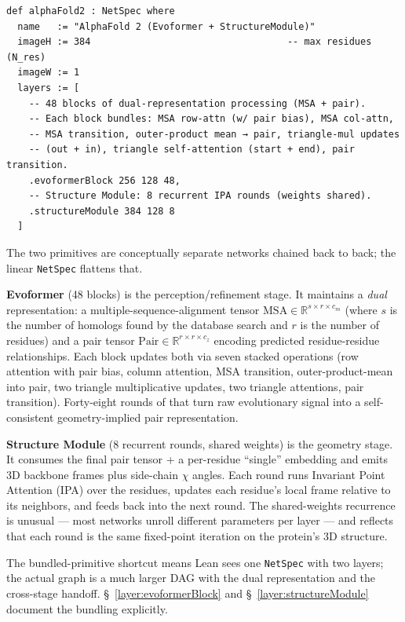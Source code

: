 \appendix

\begin{verbatim}
def alphaFold2 : NetSpec where
  name   := "AlphaFold 2 (Evoformer + StructureModule)"
  imageH := 384                                   -- max residues (N_res)
  imageW := 1
  layers := [
    -- 48 blocks of dual-representation processing (MSA + pair).
    -- Each block bundles: MSA row-attn (w/ pair bias), MSA col-attn,
    -- MSA transition, outer-product mean → pair, triangle-mul updates
    -- (out + in), triangle self-attention (start + end), pair transition.
    .evoformerBlock 256 128 48,
    -- Structure Module: 8 recurrent IPA rounds (weights shared).
    .structureModule 384 128 8
  ]
\end{verbatim}

The two primitives are conceptually separate networks chained back to
back; the linear \texttt{NetSpec} flattens that.

\textbf{Evoformer} (48 blocks) is the perception/refinement stage. It
maintains a \emph{dual} representation: a multiple-sequence-alignment
tensor $\mathrm{MSA}\!\in\!\mathbb{R}^{s \times r \times c_m}$ (where
$s$ is the number of homologs found by the database search and $r$ is
the number of residues) and a pair tensor
$\mathrm{Pair}\!\in\!\mathbb{R}^{r \times r \times c_z}$ encoding
predicted residue-residue relationships. Each block updates both via
seven stacked operations (row attention with pair bias, column
attention, MSA transition, outer-product-mean into pair, two triangle
multiplicative updates, two triangle attentions, pair transition).
Forty-eight rounds of that turn raw evolutionary signal into a
self-consistent geometry-implied pair representation.

\textbf{Structure Module} (8 recurrent rounds, shared weights) is the
geometry stage. It consumes the final pair tensor + a per-residue
``single'' embedding and emits 3D backbone frames plus side-chain
$\chi$ angles. Each round runs Invariant Point Attention (IPA) over
the residues, updates each residue's local frame relative to its
neighbors, and feeds back into the next round. The shared-weights
recurrence is unusual --- most networks unroll different parameters
per layer --- and reflects that each round is the same fixed-point
iteration on the protein's 3D structure.

The bundled-primitive shortcut means Lean sees one \texttt{NetSpec}
with two layers; the actual graph is a much larger DAG with the dual
representation and the cross-stage handoff. \S~\ref{layer:evoformerBlock}
and \S~\ref{layer:structureModule} document the bundling explicitly.

